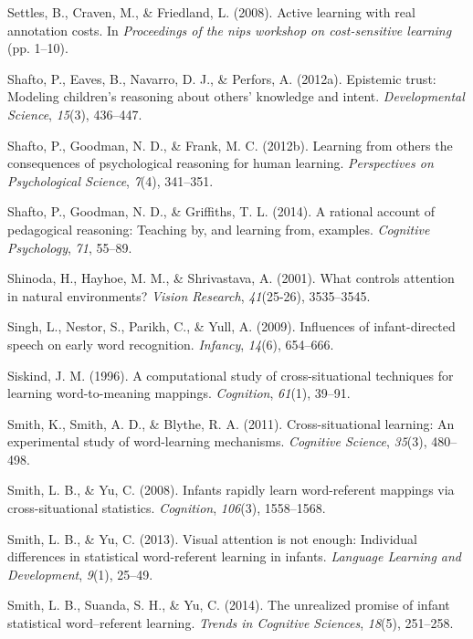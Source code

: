 \documentclass[oneside]{report}
\begin{document}
\hypertarget{ref-settles2008active}{}
Settles, B., Craven, M., \& Friedland, L. (2008). Active learning with
real annotation costs. In \emph{Proceedings of the nips workshop on
cost-sensitive learning} (pp. 1--10).

\hypertarget{ref-shafto2012epistemic}{}
Shafto, P., Eaves, B., Navarro, D. J., \& Perfors, A. (2012a). Epistemic
trust: Modeling children's reasoning about others' knowledge and intent.
\emph{Developmental Science}, \emph{15}(3), 436--447.

\hypertarget{ref-shafto2012learning}{}
Shafto, P., Goodman, N. D., \& Frank, M. C. (2012b). Learning from
others the consequences of psychological reasoning for human learning.
\emph{Perspectives on Psychological Science}, \emph{7}(4), 341--351.

\hypertarget{ref-shafto2014rational}{}
Shafto, P., Goodman, N. D., \& Griffiths, T. L. (2014). A rational
account of pedagogical reasoning: Teaching by, and learning from,
examples. \emph{Cognitive Psychology}, \emph{71}, 55--89.

\hypertarget{ref-shinoda2001controls}{}
Shinoda, H., Hayhoe, M. M., \& Shrivastava, A. (2001). What controls
attention in natural environments? \emph{Vision Research},
\emph{41}(25-26), 3535--3545.

\hypertarget{ref-singh2009influences}{}
Singh, L., Nestor, S., Parikh, C., \& Yull, A. (2009). Influences of
infant-directed speech on early word recognition. \emph{Infancy},
\emph{14}(6), 654--666.

\hypertarget{ref-siskind1996computational}{}
Siskind, J. M. (1996). A computational study of cross-situational
techniques for learning word-to-meaning mappings. \emph{Cognition},
\emph{61}(1), 39--91.

\hypertarget{ref-smith2011cross}{}
Smith, K., Smith, A. D., \& Blythe, R. A. (2011). Cross-situational
learning: An experimental study of word-learning mechanisms.
\emph{Cognitive Science}, \emph{35}(3), 480--498.

\hypertarget{ref-smith2008infants}{}
Smith, L. B., \& Yu, C. (2008). Infants rapidly learn word-referent
mappings via cross-situational statistics. \emph{Cognition},
\emph{106}(3), 1558--1568.

\hypertarget{ref-smith2013visual}{}
Smith, L. B., \& Yu, C. (2013). Visual attention is not enough:
Individual differences in statistical word-referent learning in infants.
\emph{Language Learning and Development}, \emph{9}(1), 25--49.

\hypertarget{ref-smith2014unrealized}{}
Smith, L. B., Suanda, S. H., \& Yu, C. (2014). The unrealized promise of
infant statistical word--referent learning. \emph{Trends in Cognitive
Sciences}, \emph{18}(5), 251--258.
\end{document}
